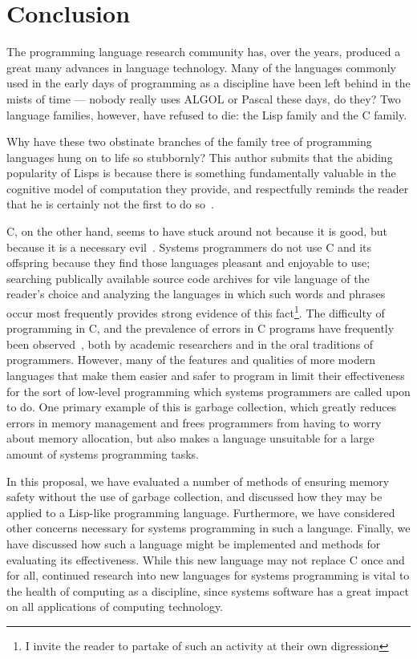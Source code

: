 \documentclass[11pt]{article}
\theoremstyle{break}
\begin{document}
\vspace*{-.1in}
\section{Conclusion}
\label{sec:conclusion}
\vspace*{-.1in}

The programming language research community has, over the years, produced a great many advances in language technology. Many of the languages commonly used in the early days of programming as a discipline have been left behind in the mists of time --- nobody really uses ALGOL or Pascal these days, do they? Two language families, however, have refused to die: the Lisp family and the C family.

Why have these two obstinate branches of the family tree of programming languages hung on to life so stubbornly? This author submits that the abiding popularity of Lisps is because there is something fundamentally valuable in the cognitive model of computation they provide, and respectfully reminds the reader that he is certainly not the first to do so~\cite{sicp,raymond2003become}.

C, on the other hand, seems to have stuck around not because it is good, but because it is a necessary evil~\cite{Shapiro:2006:PLC:1215995.1216004}. Systems programmers do not use C and its offspring because they find those languages pleasant and enjoyable to use; searching publically available source code archives for vile language of the reader's choice and analyzing the languages in which such words and phrases occur most frequently provides strong evidence of this fact\footnote{I invite the reader to partake of such an activity at their own digression}. The difficulty of programming in C, and the prevalence of errors in C programs have frequently been observed~\cite{Shapiro:2006:PLC:1215995.1216004,Bhattacharya:2011:APL:1985793.1985817,Ray:2014:LSS:2635868.2635922}, both by academic researchers and in the oral traditions of programmers. However, many of the features and qualities of more modern languages that make them easier and safer to program in limit their effectiveness for the sort of low-level programming which systems programmers are called upon to do. One primary example of this is garbage collection, which greatly reduces errors in memory management and frees programmers from having to worry about memory allocation, but also makes a language unsuitable for a large amount of systems programming tasks.

In this proposal, we have evaluated a number of methods of ensuring memory safety without the use of garbage collection, and discussed how they may be applied to a Lisp-like programming language. Furthermore, we have considered other concerns necessary for systems programming in such a language. Finally, we have discussed how such a language might be implemented and methods for evaluating its effectiveness. While this new language may not replace C once and for all, continued research into new languages for systems programming is vital to the health of computing as a discipline, since systems software has a great impact on all applications of computing technology.

\pagebreak
\printbibliography
\end{document}
